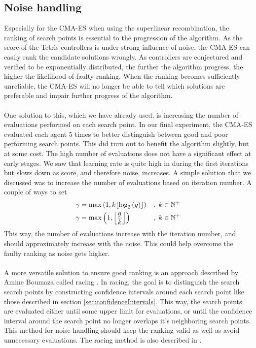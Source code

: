 \subsection{Noise handling}

Especially for the CMA-ES when using the superlinear recombination, the ranking of search
points is essential to the progression of the algorithm. As the score of the Tetris controllers
is under strong influence of noise, the CMA-ES can easily rank the 
candidate solutions wrongly. As controllers are conjectured and verified to
be exponentially distributed, the further the algorithm progress, the higher the likelihood
of faulty ranking. When the ranking becomes sufficiently unreliable, the CMA-ES will
no longer be able to tell which solutions are preferable and impair further progress
of the algorithm.\\
\\
One solution to this, which we have already used, is increasing the number of evaluations
performed on each search point. In our final experiment, the CMA-ES evaluated each agent
5 times to better distinguish between good and poor performing search points. This did turn out
to benefit the algorithm slightly, but at some cost. The high number of evaluations does not have a
significant effect at early stages. We saw that learning rate is quite high in during the first 
iterations but slows down as score, and therefore noise, increases. A simple solution
that we discussed  was to increase the number of evaluations based on iteration number.
A couple of ways to set 
\begin{align}
\gamma &=  \max\left( 1, k \lfloor \log_{2} \left( g \right)  \rfloor \right) &,\ k \in \mathbb{N}^+\\
\gamma &=  \max\left( 1, \left \lfloor{ \frac{g}{k} }\right \rfloor \right) &,\ k \in \mathbb{N}^+
\end{align}
This way, the number of evaluations increase with the iteration number, and should approximately
increase with the noise. This could help overcome the faulty ranking as noise gets higher.\\
\\
A more versatile solution to ensure good ranking is an approach described by
Amine Boumaza called racing \citep{boumaza2011:b}. In racing, the goal is to 
distinguish the search search points by constructing confidence intervals around each
search point like those described in section \ref{sec:confidenceIntervals}.
This way, the search points are evaluated either until some upper limit for evaluations,
or until the confidence interval around the search point no longer overlaps it's
neighboring search points. This method for noise handling should keep the ranking 
valid as well as avoid unnecessary evaluations. The racing method is also described in 
\citep{heidrich-meisner:09c}.


